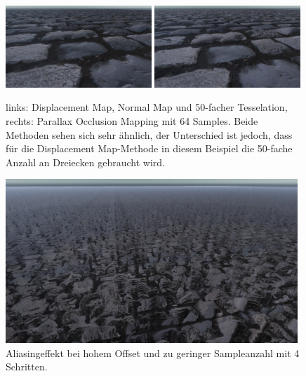\begin{figure}[!ht]
	\includegraphics[width=0.49\textwidth]{Grafiken/Basics/Mapping/Vergleich_DisplacementNormalTesselated.png}
	\includegraphics[width=0.49\textwidth]{Grafiken/Basics/Mapping/Vergleich_POM_64Steps.png}
	\begin{footnotesize}
		\caption{links: Displacement Map, Normal Map und 50-facher Tesselation, rechts: Parallax Occlusion Mapping mit 64 Samples. 
		Beide Methoden sehen sich sehr ähnlich, der Unterschied ist jedoch, dass für die Displacement Map-Methode in diesem Beispiel die 50-fache Anzahl an
		Dreiecken gebraucht wird.}
	\end{footnotesize}
\end{figure}


\begin{figure}[!h]
	\centering
	\includegraphics[width=0.98\textwidth]{Grafiken/Basics/Mapping/aliasing.png}
	\begin{footnotesize}
		\caption{Aliasingeffekt bei hohem Offset und zu geringer Sampleanzahl mit 4 Schritten.}
		\label{fig:alias}
	\end{footnotesize}
\end{figure}
